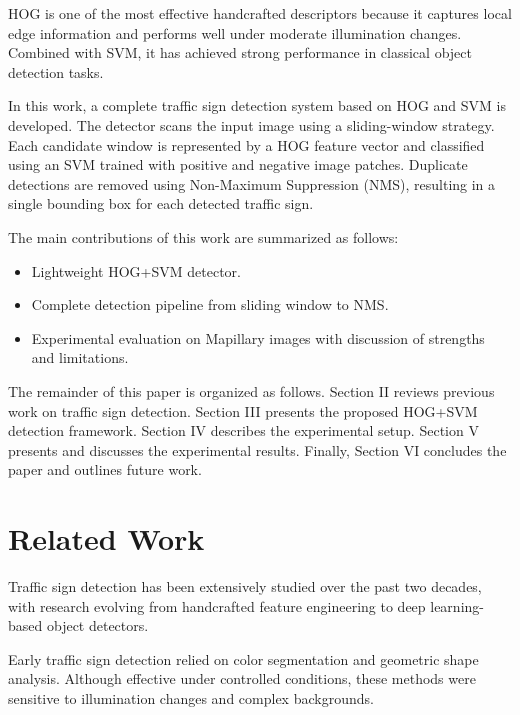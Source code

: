 \documentclass[11pt,a4paper,twoside]{article}
\begin{document}
HOG is one of the most effective handcrafted descriptors because it captures local edge information and performs well under moderate illumination changes. Combined with SVM, it has achieved strong performance in classical object detection tasks.

In this work, a complete traffic sign detection system based on HOG and SVM is developed. The detector scans the input image using a sliding-window strategy. Each candidate window is represented by a HOG feature vector and classified using an SVM trained with positive and negative image patches. Duplicate detections are removed using Non-Maximum Suppression (NMS), resulting in a single bounding box for each detected traffic sign.

The main contributions of this work are summarized as follows:

\begin{itemize}
\item Lightweight HOG+SVM detector.

\item Complete detection pipeline from sliding window to NMS.

\item Experimental evaluation on Mapillary images with discussion of strengths and limitations.

\end{itemize}

The remainder of this paper is organized as follows. Section II reviews previous work on traffic sign detection. Section III presents the proposed HOG+SVM detection framework. Section IV describes the experimental setup. Section V presents and discusses the experimental results. Finally, Section VI concludes the paper and outlines future work.

\section{Related Work}

Traffic sign detection has been extensively studied over the past two decades, with research evolving from handcrafted feature engineering to deep learning-based object detectors.

Early traffic sign detection relied on color segmentation and geometric shape analysis. Although effective under controlled conditions, these methods were sensitive to illumination changes and complex backgrounds.
\end{document}
